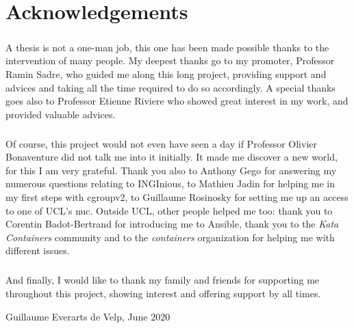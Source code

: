 \chapter*{Acknowledgements}

\paragraph{}A thesis is not a one-man job, this one has been made possible thanks to the intervention of many people.  My deepest thanks go to my promoter, Professor Ramin Sadre, who guided me along this long project, providing support and advices and taking all the time required to do so accordingly.  A special thanks goes also to Professor Etienne Riviere who showed great interest in my work, and provided valuable advices.

\paragraph{}Of course, this project would not even have seen a day if Professor Olivier Bonaventure did not talk me into it initially. It made me discover a new world, for this I am very grateful.  Thank you also to Anthony Gego for answering my numerous questions relating to INGInious, to Mathieu Jadin for helping me in my first steps with cgroupv2, to Guillaume Rosinosky for setting me up an access to one of UCL's nuc.  Outside UCL, other people helped me too: thank you to Corentin Badot-Bertrand for introducing me to Ansible, thank you to the \textit{Kata Containers} community and to the \textit{containers} organization for helping me with different issues.

\paragraph{}And finally, I would like to thank my family and friends for supporting me throughout this project, showing interest and offering support by all times. 

\begin{flushright}
  Guillaume Everarts de Velp, June 2020
\end{flushright}
